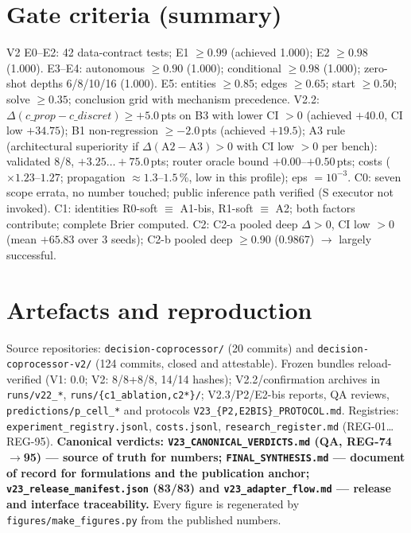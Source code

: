 \documentclass[11pt,a4paper]{article}
\newcommand{\code}[1]{\texttt{#1}}
\newcommand{\dpt}{\ensuremath{\Delta}}
\begin{document}
\section{Gate criteria (summary)}
V2 E0--E2: 42 data-contract tests; E1 $\ge0.99$ (achieved 1.000); E2 $\ge0.98$ (1.000). E3--E4: autonomous $\ge0.90$ (1.000); conditional $\ge0.98$ (1.000); zero-shot depths 6/8/10/16 (1.000). E5: entities $\ge0.85$; edges $\ge0.65$; start $\ge0.50$; solve $\ge0.35$; conclusion grid with mechanism precedence. V2.2: $\dpt(c\_prop-c\_discret) \ge +5.0$\,pts on B3 with lower CI $>0$ (achieved $+40.0$, CI low $+34.75$); B1 non-regression $\ge -2.0$\,pts (achieved $+19.5$); A3 rule (architectural superiority if $\dpt(\mathrm{A2}-\mathrm{A3})>0$ with CI low $>0$ per bench): validated 8/8, $+3.25\ldots+75.0$\,pts; router oracle bound $+0.00$--$+0.50$\,pts; costs ($\times1.23$--$1.27$; propagation $\approx1.3$--$1.5$\,\%, low in this profile); eps $=10^{-3}$. C0: seven scope errata, no number touched; public inference path verified (S executor not invoked). C1: identities R0-soft $\equiv$ A1-bis, R1-soft $\equiv$ A2; both factors contribute; complete Brier computed. C2: C2-a pooled deep $\dpt>0$, CI low $>0$ (mean $+65.83$ over 3 seeds); C2-b pooled deep $\ge0.90$ (0.9867) $\to$ largely successful.

\section{Artefacts and reproduction}
Source repositories: \code{decision-coprocessor/} (20 commits) and \code{decision-coprocessor-v2/} (124 commits, closed and attestable). Frozen bundles reload-verified (V1: 0.0; V2: 8/8+8/8, 14/14 hashes); V2.2/confirmation archives in \code{runs/v22\_*}, \code{runs/\{c1\_ablation,c2*\}/}; V2.3/P2/E2-bis reports, QA reviews, \code{predictions/p\_cell\_*} and protocols \code{V23\_\{P2,E2BIS\}\_PROTOCOL.md}. Registries: \code{experiment\_registry.jsonl}, \code{costs.jsonl}, \code{research\_register.md} (REG-01\ldots REG-95). \textbf{Canonical verdicts: \code{V23\_CANONICAL\_VERDICTS.md} (QA, REG-74$\to$95) --- source of truth for numbers; \code{FINAL\_SYNTHESIS.md} --- document of record for formulations and the publication anchor; \code{v23\_release\_manifest.json} (83/83) and \code{v23\_adapter\_flow.md} --- release and interface traceability.} Every figure is regenerated by \code{figures/make\_figures.py} from the published numbers.
\end{document}

